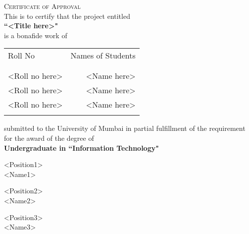 \newpage
\thispagestyle{empty}

\begin{center}
    \Large \textsc {Certificate of Approval}\\[0.5cm]
    \normalsize This is to certify that the project entitled\\[0.5cm]
    \large \textbf {``<Title here>"}\\[0.5cm]
    \normalsize is a bonafide work of
\end{center}

\begin{table}[h]
    \centering
    \begin{tabular}{lr}
        Roll No        & Names of Students \\ \\ \hline
        \\
        <Roll no here> & <Name here>       \\
        <Roll no here> & <Name here>       \\
        <Roll no here> & <Name here>       \\ \\ \hline
    \end{tabular}
\end{table}

\begin{center}
    submitted to the University of Mumbai in partial fulfillment of the requirement for the award of the degree of\\
    \vspace{0.5cm}
    \large \textbf {Undergraduate in ``Information Technology"}\\[0.5cm]
\end{center}

\vspace{1.0cm}
\begin{center}
    \begin{minipage}[b]{0.33333\textwidth}
        \raggedright
        <Position1>\\
        <Name1>
    \end{minipage}%
    \begin{minipage}[b]{0.33333\textwidth}
        \centering
        <Position2>\\
        <Name2>
    \end{minipage}%
    \begin{minipage}[b]{0.33333\textwidth}
        \raggedleft
        <Position3>\\
        <Name3>
    \end{minipage}
\end{center}